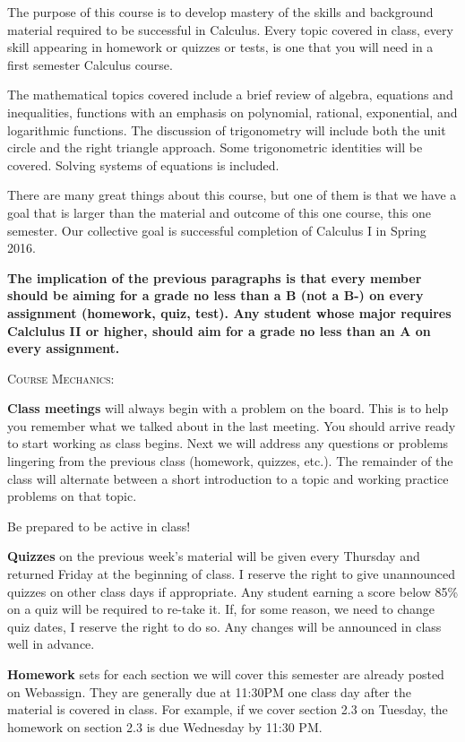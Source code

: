 \documentclass[11pt]{article}
\begin{document}
The purpose of this course is to develop mastery of the skills and background material required to be successful in Calculus.  Every topic covered in class, every skill appearing in homework or quizzes or tests, is one that you will need in a first semester Calculus course.

The mathematical topics covered include a brief review of algebra, equations and inequalities, functions with an emphasis on polynomial, rational, exponential, and logarithmic functions. The discussion of trigonometry will include both the unit circle and the right triangle approach. Some trigonometric identities will be covered. Solving systems of equations is included.

There are many great things about this course, but one of them is that we have a goal that is larger than the material and outcome of this one course, this one semester.  Our collective goal is successful completion of Calculus I in Spring 2016.

\textbf{The implication of the previous paragraphs is that every member should be aiming for a grade no less than a B (not a B-) on every assignment (homework, quiz, test). Any student whose major requires Calclulus II or higher,  should aim for a grade no less than an A on every assignment.}

\textsc{Course Mechanics}:

\textbf{Class meetings} will always begin with a problem on the board. This is to help you remember what we talked about in the last meeting. You should arrive ready to start working as class begins. Next we will address any questions or problems lingering from the previous class (homework, quizzes, etc.). The remainder of the class will alternate between a short introduction to a topic and working practice problems on that topic. 

Be prepared to be active in class!

\textbf{Quizzes} on the previous week's material will be given every Thursday and returned Friday at the beginning of class. I reserve the right to give unannounced quizzes on other class days if appropriate. Any student earning a score below 85\% on a quiz will be required to re-take it. If, for some reason, we need to change quiz dates, I reserve the right to do so. Any changes will be announced in class well in advance.

\textbf{Homework} sets for each section we will cover this semester are already posted on Webassign. They are generally due at 11:30PM one class day after the material is covered in class.  For example, if we cover section 2.3 on Tuesday, the homework on section 2.3 is due Wednesday by 11:30 PM.
\end{document}

